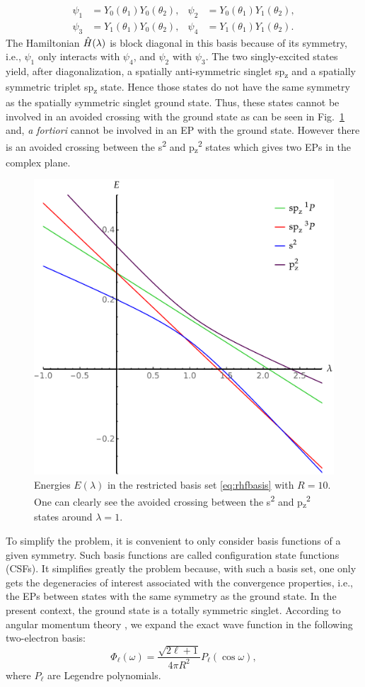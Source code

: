 \documentclass[11pt,a4paper]{article}
\newcommand{\hH}{\Hat{H}}
\begin{document}
\begin{align}\label{eq:rhfbasis}
 \psi_1 & =Y_{0}(\theta_1)Y_{0}(\theta_2),
 & 
 \psi_2 & =Y_{0}(\theta_1)Y_{1}(\theta_2),\\
 \psi_3 & =Y_{1}(\theta_1)Y_{0}(\theta_2),
 & 
 \psi_4 & =Y_{1}(\theta_1)Y_{1}(\theta_2).
\end{align}
The Hamiltonian $\hH(\lambda)$ is block diagonal in this basis because of its symmetry, i.e., $\psi_1$ only interacts with $\psi_4$, and $\psi_2$ with $\psi_3$. The two singly-excited states yield, after diagonalization, a spatially anti-symmetric singlet sp\textsubscript{z} and a spatially symmetric triplet sp\textsubscript{z} state. Hence those states do not have the same symmetry as the spatially symmetric singlet ground state. Thus, these states cannot be involved in an avoided crossing with the ground state as can be seen in Fig.~\ref{fig:RHFMiniBas} and, \textit{a fortiori} cannot be involved in an EP with the ground state. However there is an avoided crossing between the s\textsuperscript{2} and p\textsubscript{z}\textsuperscript{2} states which gives two EPs in the complex plane. 

\begin{figure}
    \centering
    \includegraphics[width=0.5\linewidth]{EMP_RHF_R10.pdf}
    \caption{Energies $E(\lambda)$ in the restricted basis set \eqref{eq:rhfbasis} with $R=10$.
    One can clearly see the avoided crossing between the s\textsuperscript{2} and p\textsubscript{z}\textsuperscript{2} states around $\lambda = 1$.}
    \label{fig:RHFMiniBas}
\end{figure}

To simplify the problem, it is convenient to only consider basis functions of a given symmetry. Such basis functions are called configuration state functions (CSFs). It simplifies greatly the problem because, with such a basis set, one only gets the degeneracies of interest associated with the convergence properties, i.e., the EPs between states with the same symmetry as the ground state. In the present context, the ground state is a totally symmetric singlet. According to angular momentum theory \cite{AngularBook, SlaterBook, Loos_2009}, we expand the exact wave function in the following two-electron basis:
\begin{equation}
\Phi_\ell(\omega)=\frac{\sqrt{2\ell+1}}{4\pi R^2}P_\ell(\cos\omega),
\end{equation}
where $P_\ell$ are Legendre polynomials.
\end{document}

